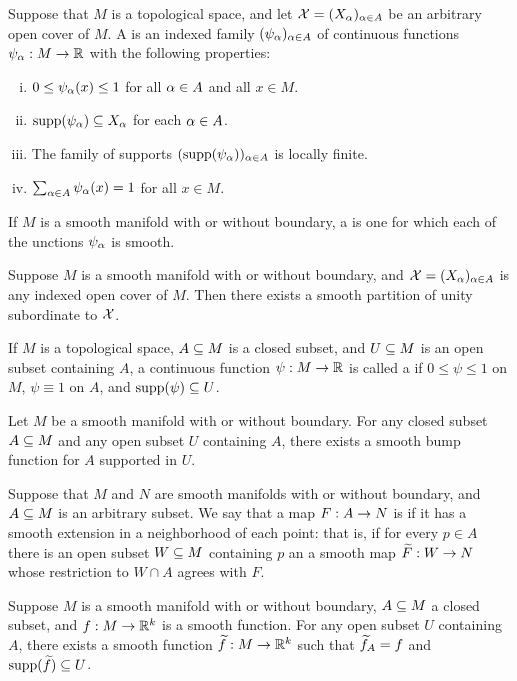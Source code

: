 \dfn Suppose that $M$ is a topological space, and let $\mathcal{X} = (X_\alpha)_{\alpha\in A}$ be an arbitrary open cover of $M$. A  is an indexed family $(\psi_\alpha)_{\alpha\in A}$ of continuous functions $\psi_\alpha:M\rightarrow \mathbb{R}$ with the following properties:
\begin{enumerate}[(i)]
    \item $0 \leq \psi_\alpha(x)\leq 1$ for all $\alpha\in A$ and all $x\in M$.
    \item $\text{supp}(\psi_\alpha) \subseteq X_\alpha$ for each $\alpha\in A$.
    \item The family of supports $(\text{supp}(\psi_\alpha))_{\alpha\in A}$ is locally finite. 
    \item $\sum_{\alpha\in A}\psi_\alpha(x) = 1$ for all $x\in M$.
\end{enumerate}
If $M$ is a smooth manifold with or without boundary, a  is one for which each of the unctions $\psi_\alpha$ is smooth.

\begin{thm}
Suppose $M$ is a smooth manifold with or without boundary, and $\mathcal{X} = (X_\alpha)_{\alpha\in A}$ is any indexed open cover of $M$. Then there exists a smooth partition of unity subordinate to $\mathcal{X}$.
\end{thm}

\dfn If $M$ is a topological space, $A\subseteq M$ is a closed subset, and $U\subseteq M$ is an open subset containing $A$, a continuous function $\psi:M\rightarrow \mathbb{R}$ is called a  if $0 \leq \psi \leq 1$ on $M$, $\psi \equiv 1$ on $A$, and $\text{supp}(\psi)\subseteq U$.

\setcounter{thm}{24}

\begin{prop}
Let $M$ be a smooth manifold with or without boundary. For any closed subset $A\subseteq M$ and any open subset $U$ containing $A$, there exists a smooth bump function for $A$ supported in $U$.
\end{prop}

\dfn Suppose that $M$ and $N$ are smooth manifolds with or  without boundary, and $A\subseteq M$ is an arbitrary subset. We say that a map $F:A\rightarrow N$ is  if it has a smooth extension in a neighborhood of each point: that is, if for every $p\in A$ there is an open subset $W\subseteq M$ containing $p$ an a smooth map $\widetilde F:W\rightarrow N$ whose restriction to $W\cap A$ agrees with $F$.

\begin{lem}
Suppose $M$ is a smooth manifold with or without boundary, $A\subseteq M$ a closed subset, and $f:M\rightarrow \mathbb{R}^k$ is a smooth function. For any open subset $U$ containing $A$, there exists a smooth function $\widetilde f:M\rightarrow \mathbb{R}^k$ such that $\widetilde f_A = f$ and $\text{supp}(\widetilde f)\subseteq U$.
\end{lem}


